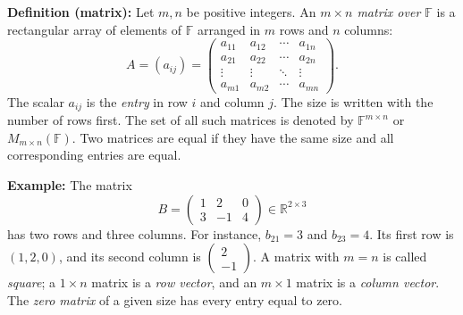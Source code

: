 \documentclass[a4paper,11pt,abstract=true]{scrartcl}
\theoremstyle{dotlessP}
\theoremstyle{dotlessS}
\theoremstyle{remark}
\theoremstyle{definition}
\begin{document}
\begin{definition_box}
\textbf{Definition (matrix):} Let $m,n$ be positive integers. An
\emph{$m\times n$ matrix over $\mathbb{F}$} is a rectangular array of
elements of $\mathbb{F}$ arranged in $m$ rows and $n$ columns:
\[
A=(a_{ij})=
\begin{pmatrix}
a_{11}&a_{12}&\cdots&a_{1n}\\
a_{21}&a_{22}&\cdots&a_{2n}\\
\vdots&\vdots&\ddots&\vdots\\
a_{m1}&a_{m2}&\cdots&a_{mn}
\end{pmatrix}.
\]
The scalar $a_{ij}$ is the \emph{entry} in row $i$ and column $j$.
The size is written with the number of rows first. The set of all such
matrices is denoted by $\mathbb{F}^{m\times n}$ or
$M_{m\times n}(\mathbb{F})$. Two matrices are equal if they have the
same size and all corresponding entries are equal.
\end{definition_box}

\begin{example_box}
\textbf{Example:} The matrix
\[
B=\begin{pmatrix}1&2&0\\3&-1&4\end{pmatrix}
\in\mathbb{R}^{2\times3}
\]
has two rows and three columns. For instance, $b_{21}=3$ and $b_{23}=4$.
Its first row is $(1,2,0)$, and its second column is
$\begin{pmatrix}2\\-1\end{pmatrix}$.
A matrix with $m=n$ is called \emph{square}; a $1\times n$ matrix is a
\emph{row vector}, and an $m\times1$ matrix is a \emph{column vector}.
The \emph{zero matrix} of a given size has every entry equal to zero.
\end{example_box}
\end{document}
